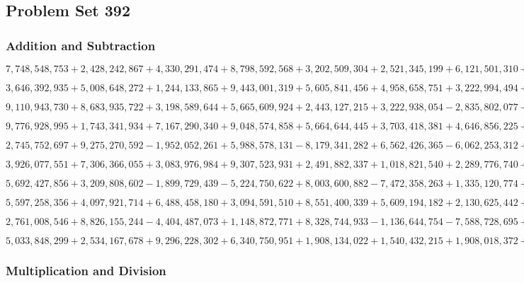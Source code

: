 \hypertarget{problem-set-392}{%
\subsection{Problem Set 392}\label{problem-set-392}}

\hypertarget{addition-and-subtraction}{%
\subsubsection{Addition and
Subtraction}\label{addition-and-subtraction}}

\(7,748,548,753+2,428,242,867+4,330,291,474+8,798,592,568+3,202,509,304+2,521,345,199+6,121,501,310+7,174,809,919+3,493,034,381+8,924,112,530\)

\(3,646,392,935+5,008,648,272+1,244,133,865+9,443,001,319+5,605,841,456+4,958,658,751+3,222,994,494+5,818,424,635+7,926,687,543+1,687,546,723\)

\(9,110,943,730+8,683,935,722+3,198,589,644+5,665,609,924+2,443,127,215+3,222,938,054-2,835,802,077-3,226,131,199-9,300,026,971-5,863,274,751\)

\(9,776,928,995+1,743,341,934+7,167,290,340+9,048,574,858+5,664,644,445+3,703,418,381+4,646,856,225+6,190,464,845+5,473,549,575+8,710,307,520\)

\(2,745,752,697+9,275,270,592-1,952,052,261+5,988,578,131-8,179,341,282+6,562,426,365-6,062,253,312+8,775,543,986-4,200,337,370+2,165,160,788\)

\(3,926,077,551+7,306,366,055+3,083,976,984+9,307,523,931+2,491,882,337+1,018,821,540+2,289,776,740+8,390,063,189+7,269,840,505+7,614,887,332\)

\(5,692,427,856+3,209,808,602-1,899,729,439-5,224,750,622+8,003,600,882-7,472,358,263+1,335,120,774+9,160,863,831+4,514,970,209-7,092,090,827\)

\(5,597,258,356+4,097,921,714+6,488,458,180+3,094,591,510+8,551,400,339+5,609,194,182+2,130,625,442+1,625,779,476+5,245,476,080+2,496,556,734\)

\(2,761,008,546+8,826,155,244-4,404,487,073+1,148,872,771+8,328,744,933-1,136,644,754-7,588,728,695+8,336,859,415-1,094,303,974+4,793,126,086\)

\(5,033,848,299+2,534,167,678+9,296,228,302+6,340,750,951+1,908,134,022+1,540,432,215+1,908,018,372+4,622,551,803+2,393,220,872+7,061,284,163\)

\hypertarget{multiplication-and-division}{%
\subsubsection{Multiplication and
Division}\label{multiplication-and-division}}

